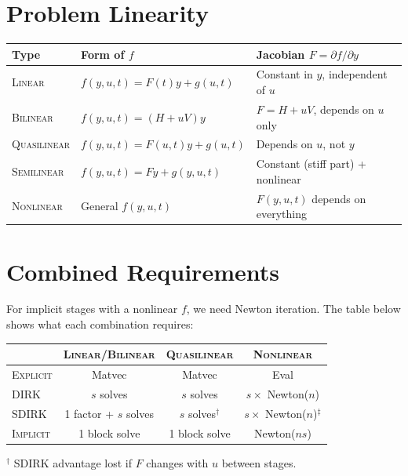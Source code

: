 \documentclass[11pt]{article}
\begin{document}
\section{Problem Linearity}

\begin{center}
\begin{tabular}{lll}
\toprule
Type & Form of $f$ & Jacobian $F = \partial f/\partial y$ \\
\midrule
\textsc{Linear} & $f(y,u,t) = F(t)y + g(u,t)$ & Constant in $y$, independent of $u$ \\
\textsc{Bilinear} & $f(y,u,t) = (H + uV)y$ & $F = H + uV$, depends on $u$ only \\
\textsc{Quasilinear} & $f(y,u,t) = F(u,t)y + g(u,t)$ & Depends on $u$, not $y$ \\
\textsc{Semilinear} & $f(y,u,t) = Fy + g(y,u,t)$ & Constant (stiff part) + nonlinear \\
\textsc{Nonlinear} & General $f(y,u,t)$ & $F(y,u,t)$ depends on everything \\
\bottomrule
\end{tabular}
\end{center}

\section{Combined Requirements}

For implicit stages with a nonlinear $f$, we need Newton iteration. The table below shows what each combination requires:

\begin{center}
\begin{tabular}{l|ccc}
\toprule
& \textsc{Linear/Bilinear} & \textsc{Quasilinear} & \textsc{Nonlinear} \\
\midrule
\textsc{Explicit} & Matvec & Matvec & Eval \\
\textsc{DIRK} & $s$ solves & $s$ solves & $s \times$ Newton($n$) \\
\textsc{SDIRK} & 1 factor + $s$ solves & $s$ solves$^\dagger$ & $s \times$ Newton($n$)$^\ddagger$ \\
\textsc{Implicit} & 1 block solve & 1 block solve & Newton($ns$) \\
\bottomrule
\end{tabular}
\end{center}

$^\dagger$ SDIRK advantage lost if $F$ changes with $u$ between stages.
\end{document}
